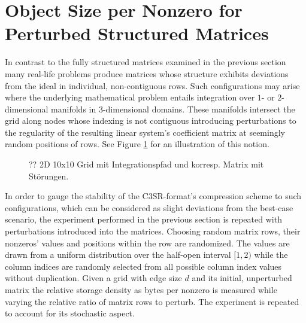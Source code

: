   \section{Object Size per Nonzero for Perturbed Structured Matrices}

    In contrast to the fully structured matrices examined in the previous section many real-life problems produce
    matrices whose structure exhibits deviations from the ideal in individual, non-contiguous rows. Such configurations
    may arise where the underlying mathematical problem entails integration over $1$- or $2$-dimensional manifolds in
    $3$-dimensional domains. These manifolds intersect the grid along nodes whose indexing is not contiguous introducing
    perturbations to the regularity of the resulting linear system's coefficient matrix at seemingly random positions of
    rows. See Figure \ref{fig:structured-grid-with-path} for an illustration of this notion.

    \begin{figure}[H]
      \centering
      \captionsetup{width=0.9\textwidth}

        {?? 2D 10x10 Grid mit Integrationspfad und korresp. Matrix mit Störungen.}
      \label{fig:structured-grid-with-path}
    \end{figure}

    In order to gauge the stability of the C3SR-format's compression scheme to such configurations, which can be
    considered as slight deviations from the best-case scenario, the experiment performed in the previous section is
    repeated with perturbations introduced into the matrices. Choosing random matrix rows, their nonzeros' values and
    positions within the row are randomized. The values are drawn from a uniform distribution over the half-open
    interval $[1, 2)$ while the column indices are randomly selected from all possible column index values without
    duplication. Given a grid with edge size $d$ and its initial, unperturbed matrix the relative storage density as
    bytes per nonzero is measured while varying the relative ratio of matrix rows to perturb. The experiment is repeated
    to account for its stochastic aspect.

